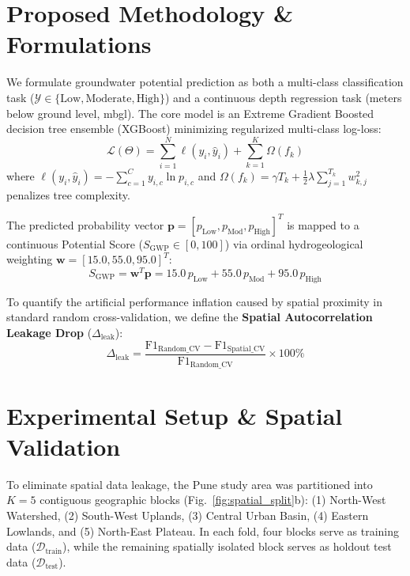 \documentclass[conference]{IEEEtran}
\begin{document}
\section{Proposed Methodology \& Formulations}
We formulate groundwater potential prediction as both a multi-class classification task ($\mathcal{Y} \in \{\text{Low}, \text{Moderate}, \text{High}\}$) and a continuous depth regression task (meters below ground level, mbgl). The core model is an Extreme Gradient Boosted decision tree ensemble (XGBoost) \cite{chen2016} minimizing regularized multi-class log-loss:
\begin{equation}
\mathcal{L}(\Theta) = \sum_{i=1}^N \ell\left(y_i, \hat{y}_i\right) + \sum_{k=1}^K \Omega(f_k)
\label{eq:xgboost_loss}
\end{equation}
where $\ell(y_i, \hat{y}_i) = -\sum_{c=1}^C y_{i,c} \ln p_{i,c}$ and $\Omega(f_k) = \gamma T_k + \frac{1}{2} \lambda \sum_{j=1}^{T_k} w_{k,j}^2$ penalizes tree complexity.

The predicted probability vector $\mathbf{p} = [p_{\text{Low}}, p_{\text{Mod}}, p_{\text{High}}]^T$ is mapped to a continuous Potential Score ($S_{\text{GWP}} \in [0, 100]$) via ordinal hydrogeological weighting $\mathbf{w} = [15.0, 55.0, 95.0]^T$:
\begin{equation}
S_{\text{GWP}} = \mathbf{w}^T \mathbf{p} = 15.0\,p_{\text{Low}} + 55.0\,p_{\text{Mod}} + 95.0\,p_{\text{High}}
\label{eq:gwp_score}
\end{equation}

To quantify the artificial performance inflation caused by spatial proximity in standard random cross-validation, we define the \textbf{Spatial Autocorrelation Leakage Drop} ($\Delta_{\text{leak}}$):
\begin{equation}
\Delta_{\text{leak}} = \frac{\text{F1}_{\text{Random\_CV}} - \text{F1}_{\text{Spatial\_CV}}}{\text{F1}_{\text{Random\_CV}}} \times 100\%
\label{eq:spatial_leakage}
\end{equation}

\section{Experimental Setup \& Spatial Validation}
To eliminate spatial data leakage, the Pune study area was partitioned into $K = 5$ contiguous geographic blocks (Fig.~\ref{fig:spatial_split}b): (1) North-West Watershed, (2) South-West Uplands, (3) Central Urban Basin, (4) Eastern Lowlands, and (5) North-East Plateau. In each fold, four blocks serve as training data ($\mathcal{D}_{\text{train}}$), while the remaining spatially isolated block serves as holdout test data ($\mathcal{D}_{\text{test}}$).
\end{document}
